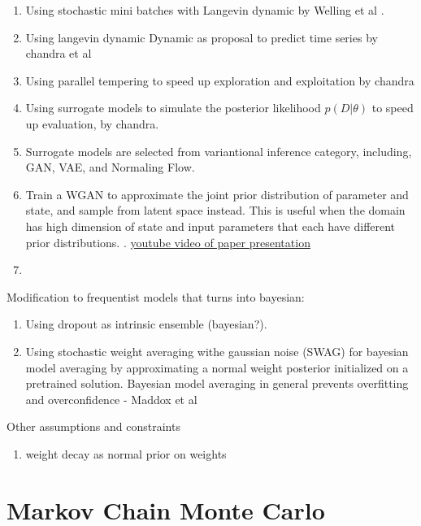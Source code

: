 \documentclass[honours,12pt]{unswthesis}
\numberwithin{equation}{section}
\begin{document}
\begin{enumerate}
\item Using stochastic mini batches with Langevin dynamic by Welling et al \cite{StochGradLangevin}.

\item Using langevin dynamic Dynamic as proposal to predict time series by chandra et al \cite{Chandra2017BayesianNL} 

\item Using parallel tempering to speed up exploration and exploitation by chandra \cite{LDPTBNN}

\item Using surrogate models to simulate the posterior likelihood $p(D|\theta)$ to speed up evaluation, by chandra. \cite{SAPTBNN}

\item Surrogate models are selected from variantional inference category, including, GAN, VAE, and Normaling Flow.

\item Train a WGAN to approximate the joint prior distribution of parameter and state, and sample from latent space instead. This is useful when the domain has high dimension of state and input parameters that each have different prior distributions. \cite{mucke2021MCWGAN}. \href{https://www.youtube.com/watch?v=NpgL3Rve2Rg}{youtube video of paper presentation}

\item 
\end{enumerate}

Modification to frequentist models that turns into bayesian:
\begin{enumerate}
\item Using dropout as intrinsic ensemble (bayesian?).

\item Using stochastic weight averaging withe gaussian noise (SWAG) for bayesian model averaging by approximating a normal weight posterior initialized on a pretrained solution. Bayesian model averaging in general prevents overfitting and overconfidence  - Maddox et al \cite{NEURIPS2019_SWAG}
\end{enumerate}


Other assumptions and constraints
\begin{enumerate}
\item weight decay as normal prior on weights
\end{enumerate}
\section{Markov Chain Monte Carlo}
\end{document}

